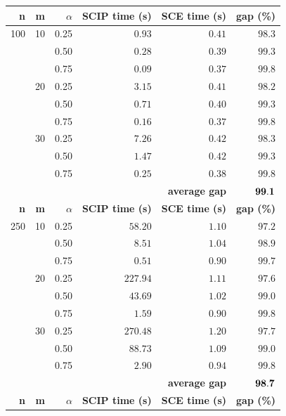 \documentclass[10pt,conference, compsocconf]{IEEEtran}
\begin{document}
\begin{table}
{
\renewcommand{\arraystretch}{1.5}%
\fontsize{8.5pt}{1em}\selectfont 
\begin{center}
\begin{tabular}[c]{|r|r|r|rrr|} \hline
\textbf{n}   & \textbf{m}  & \textbf{$\alpha$}    &\textbf{SCIP time (s)}& \textbf{SCE time (s)} & \textbf{gap (\%)} \\ \hline
100 & 10 & 0.25 & $  0.93$ & $  0.41$  & $98.3$ \\
    &    & 0.50 & $  0.28$ & $  0.39$  & $99.3$ \\
    &    & 0.75 & $  0.09$ & $  0.37$  & $99.8$ \\ \cline{2-6}
    & 20 & 0.25 & $  3.15$ & $  0.41$  & $98.2$ \\
    &    & 0.50 & $  0.71$ & $  0.40$  & $99.3$ \\
    &    & 0.75 & $  0.16$ & $  0.37$  & $99.8$ \\ \cline{2-6}
    & 30 & 0.25 & $  7.26$ & $  0.42$  & $98.3$ \\
    &    & 0.50 & $  1.47$ & $  0.42$  & $99.3$ \\
    &    & 0.75 & $  0.25$ & $  0.38$  & $99.8$ \\ \cline{2-6}
    & \multicolumn{4}{r}{\textbf{average gap}}  & $\bf 99.1$  \\ \hline \hline
\textbf{n}   & \textbf{m}  & \textbf{$\alpha$}    &\textbf{SCIP time (s)}& \textbf{SCE time (s)} & \textbf{gap (\%)} \\ \hline
250 & 10 & 0.25 & $ 58.20$ & $  1.10$  & $97.2$ \\
    &    & 0.50 & $  8.51$ & $  1.04$  & $98.9$ \\
    &    & 0.75 & $  0.51$ & $  0.90$  & $99.7$ \\ \cline{2-6}
    & 20 & 0.25 & $227.94$ & $  1.11$  & $97.6$ \\
    &    & 0.50 & $ 43.69$ & $  1.02$  & $99.0$ \\
    &    & 0.75 & $  1.59$ & $  0.90$  & $99.8$ \\ \cline{2-6}
    & 30 & 0.25 & $270.48$ & $  1.20$  & $97.7$ \\
    &    & 0.50 & $ 88.73$ & $  1.09$  & $99.0$ \\
    &    & 0.75 & $  2.90$ & $  0.94$  & $99.8$ \\ \cline{2-6}
    & \multicolumn{4}{r}{\textbf{average gap}}  & $\bf 98.7$  \\ \hline \hline
\textbf{n}   & \textbf{m}  & \textbf{$\alpha$}    &\textbf{SCIP time (s)}& \textbf{SCE time (s)} & \textbf{gap (\%)} \\ \hline

\end{tabular}
\end{center}}
\end{table}
\end{document}
